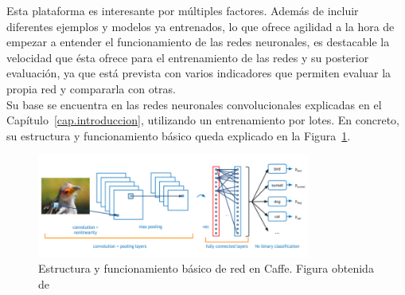 Esta plataforma es interesante por múltiples factores. Además de incluir diferentes ejemplos y modelos ya entrenados, lo que ofrece agilidad a la hora de empezar a entender el funcionamiento de las redes neuronales, es destacable la velocidad que ésta ofrece para el entrenamiento de las redes y su posterior evaluación, ya que está prevista con varios indicadores que permiten evaluar la propia red y compararla con otras.\\ 

Su base se encuentra en las redes neuronales convolucionales explicadas en el Capítulo~\ref{cap.introduccion}, utilizando un entrenamiento por lotes. En concreto, su estructura y funcionamiento básico queda explicado en la Figura~\ref{fig.redCaffe}.\\

\begin{figure}[H]
	\begin{center}
		\includegraphics[width=0.8\textwidth]{figures/red_caffe}
		\caption{Estructura y funcionamiento básico de red en Caffe. Figura obtenida de~\cite{caffe}}
		\label{fig.redCaffe}
	\end{center}
\end{figure}

